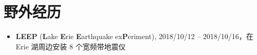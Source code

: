 \section*{野外经历}
\begin{itemize}
\item \textbf{LEEP} (\textbf{L}ake \textbf{E}rie \textbf{E}arthquake ex\textbf{P}eriment),
      2018/10/12 -- 2018/10/16，在 Erie 湖周边安装 8 个宽频带地震仪
\end{itemize}
